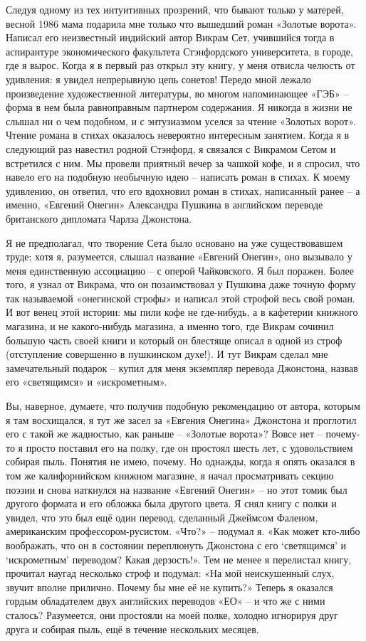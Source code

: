 \documentclass[../main.tex]{subfiles}
\begin{document}
Следуя одному из тех интуитивных прозрений, что бывают только у матерей, весной 1986 мама подарила мне только что вышедший роман «Золотые ворота». Написал его неизвестный индийский автор Викрам Сет, учившийся тогда в аспирантуре экономического факультета Стэнфордского университета, в городе, где я вырос. Когда я в первый раз открыл эту книгу, у меня отвисла челюсть от удивления: я увидел непрерывную цепь сонетов! Передо мной лежало произведение художественной литературы, во многом напоминающее «ГЭБ» \--- форма в нем была равноправным партнером содержания. Я никогда в жизни не слышал ни о чем подобном, и с энтузиазмом уселся за чтение «Золотых ворот». Чтение романа в стихах оказалось невероятно интересным занятием. Когда я в следующий раз навестил родной Стэнфорд, я связался с Викрамом Сетом и встретился с ним. Мы провели приятный вечер за чашкой кофе, и я спросил, что навело его на подобную необычную идею \--- написать роман в стихах. К моему удивлению, он ответил, что его вдохновил роман в стихах, написанный ранее \--- а именно, «Евгений Онегин» Александра Пушкина в английском переводе британского дипломата Чарлза Джонстона.

Я не предполагал, что творение Сета было основано на уже существовавшем труде; хотя я, разумеется, слышал название «Евгений Онегин», оно вызывало у меня единственную ассоциацию \--- с оперой Чайковского. Я был поражен. Более того, я узнал от Викрама, что он позаимствовал у Пушкина даже точную форму так называемой «онегинской строфы» и написал этой строфой весь свой роман. И вот венец этой истории: мы пили кофе не где-нибудь, а в кафетерии книжного магазина, и не какого-нибудь магазина, а именно того, где Викрам сочинил большую часть своей книги и который он блестяще описал в одной из строф (отступление совершенно в пушкинском духе!). И тут Викрам сделал мне замечательный подарок \--- купил для меня экземпляр перевода Джонстона, назвав его «светящимся» и «искрометным».

Вы, наверное, думаете, что получив подобную рекомендацию от автора, которым я там восхищался, я тут же засел за «Евгения Онегина» Джонстона и проглотил его с такой же жадностью, как раньше \--- «Золотые ворота»? Вовсе нет \--- почему-то я просто поставил его на полку, где он простоял шесть лет, с удовольствием собирая пыль. Понятия не имею, почему. Но однажды, когда я опять оказался в том же калифорнийском книжном магазине, я начал просматривать секцию поэзии и снова наткнулся на название «Евгений Онегин» \--- но этот томик был другого формата и его обложка была другого цвета. Я снял книгу с полки и увидел, что это был ещё один перевод, сделанный Джеймсом Фаленом, американским профессором-русистом. «Что?» \--- подумал я. «Как может кто-либо воображать, что он в состоянии переплюнуть Джонстона с его \enquote*{светящимся} и \enquote*{искрометным} переводом? Какая дерзость!». Тем не менее я перелистал книгу, прочитал наугад несколько строф и подумал: «На мой неискушенный слух, звучит вполне прилично. Почему бы мне её не купить?» Теперь я оказался гордым обладателем двух английских переводов «ЕО» \--- и что же с ними сталось? Разумеется, они простояли на моей полке, холодно игнорируя друг друга и собирая пыль, ещё в течение нескольких месяцев.
\end{document}
